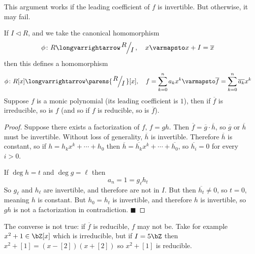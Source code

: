 \documentclass[10pt]{article}
\let\pideal=\triangleleft
\let\longto=\longvarrightarrow
\def\qed{\hskip1cm\hbox{}\hfill$\blacksquare$}
\begin{document}
This argument works if the leading coefficient of $f$ is invertible.
But otherwise, it may fail.

\begin{prop*}

    If $I\pideal R$, and we take the canonical homomorphism
    \[ \phi\colon R\longto\slfrac RI,\quad x\varmapsto x + I = \overline x \]
    then this defines a homomorphism
    \[ \phi\colon R[x]\longto\parens{\slfrac RI}[x],\quad f=\sum_{k=0}^n a_kx^k\varmapsto\overline f = \sum_{k=0}^n\overline{a_k}x^k \]
    Suppose $f$ is a monic polynomial (its leading coefficient is $1$), then if $\overline f$ is irreducible, so is $f$ (and so if $f$ is reducible, so is $\overline f$).

\end{prop*}

\begin{proof}

    Suppose there exists a factorization of $f$, $f=gh$.
    Then $\overline f=\overline g\cdot\overline h$, so $\overline g$ or $\overline h$ must be invertible.
    Without loss of generality, $\overline h$ is invertible.
    Therefore $\overline h$ is constant, so if $h=h_kx^k+\cdots+h_0$ then $\overline h=\overline{h_k}x^k+\cdots+\overline{h_0}$, so $\overline{h_i}=0$ for every $i>0$.

    If $\deg h=t$ and $\deg g=\ell$ then
    \[ a_n = 1 = g_\ell h_t \]
    So $g_\ell$ and $h_\ell$ are invertible, and therefore are not in $I$.
    But then $\overline{h_t}\neq0$, so $t=0$, meaning $h$ is constant.
    But $h_0=h_t$ is invertible, and therefore $h$ is invertible, so $gh$ is not a factorization in contradiction.
    \qed

\end{proof}

\begin{exam*}

    The converse is not true: if $\overline f$ is reducible, $f$ may not be.
    Take for example $x^2+1\in\bZ[x]$ which is irreducible, but if $I=5\bZ$ then $x^2+[1]=(x-[2])(x+[2])$ so $x^2+[1]$ is reducible.

\end{exam*}
\end{document}
